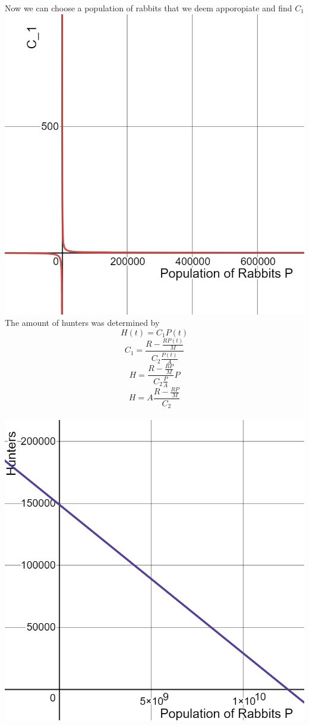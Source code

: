 \documentclass{article}
\begin{document}
Now we can choose a population of rabbits that we deem apporopiate and find $C_1$
\\
\includegraphics[scale=0.4]{Pictures/C_1-P}
\\
The amount of hunters was determined by 
$$H(t) = C_1 P(t)$$
$$ C_1 = \frac{R-\frac{RP(t)}{M}}{C_2 \frac{P(t)}{A}} $$
$$H=\frac{R-\frac{RP}{M}}{C_2 \frac{P}{A}}P$$
$$H = A\frac{R-\frac{RP}{M}}{C_2}$$
\\
\includegraphics[scale=0.3]{Pictures/H-P}
\end{document}
